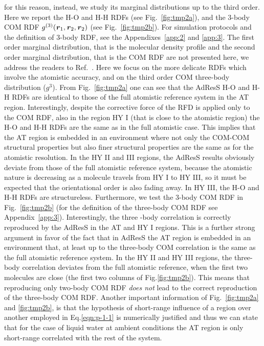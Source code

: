 \documentclass[aip,jcp,a4paper,reprint,onecolumn]{revtex4-1}
\newcommand{\vect}[1]{\textbf{\textit{#1}}}
\begin{document}
for this reason, instead, we study its marginal distributions up to the third order.
Here we report the H-O and H-H RDFs (see Fig.~\ref{fig:tmp2a}), and the 3-body COM
RDF $g^{(3)}(\vect r_1, \vect r_2, \vect r_2)$ (see Fig.~\ref{fig:tmp2b}). For simulation
protocols and the definition of 3-body RDF, see the Appendixes~\ref{app:2} and \ref{app:3}.
The first order marginal distribution, that is the molecular density profile and the second order marginal distribution, that is the COM RDF are not presented here, we address the readers to Ref.~\cite{rdfcorr}. 
Here we focus on the more delicate RDFs which involve the atomistic accuracy, and on the third order COM three-body distribution ($g^{3}$). From Fig.~\ref{fig:tmp2a} one can see that
the AdResS H-O and H-H RDFs are identical to those of 
the full atomistic reference system in the AT region.
Interestingly, despite the corrective force of the RFD is applied only to the COM RDF, also in the region HY I (that is close to the atomistic region) the H-O and H-H RDFs are the same as in the full atomistic case.
This implies that the AT region
is embedded in an environment where not only the COM-COM structural properties but also finer structural
properties are the same as for the atomistic resolution.
In the HY II and III regions, the AdResS results obviously deviate from those
of the full atomistic reference system, because the atomistic nature 
is decreasing as a molecule travels from HY I to HY III, so it must be expected 
that the orientational order is also fading away. In HY III, the H-O and H-H
RDFs are structureless.
Furthermore, we test the 3-body COM RDF in Fig.~\ref{fig:tmp2b} (for the definition of the three-body COM RDF see Appendix~\ref{app:3}).
Interestingly, the three -body correlation is correctly reproduced
by the AdResS in the AT and HY I  regions. This is a further strong argument in favor of the fact that in AdResS the AT region is embedded in an environment that, at least up to the three-body COM correlation is the same as the full atomistic reference system.
In the HY II and HY III regions, the three-body correlation deviates from the
full atomistic reference, when the first two molecules are close (the first
two columns of Fig.\ref{fig:tmp2b}). This means that reproducing only two-body COM RDF \emph{does not}
lead to the correct reproduction of the three-body COM RDF.
Another important information of Fig.~\ref{fig:tmp2a} and \ref{fig:tmp2b},
is that the hypothesis of short-range influence of a region over another employed in Eq.\ref{eqn:p-1-1} is numerically justified and thus we can state that for the case of liquid water at ambient conditions the AT region is only short-range
correlated with the rest of the system.
\end{document}
